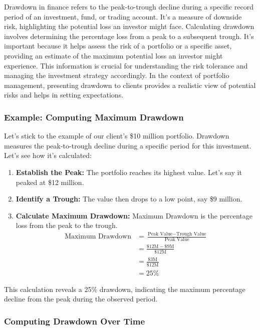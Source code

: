 \documentclass{article}
\begin{document}
Drawdown in finance refers to the peak-to-trough decline during a specific record period of an investment, fund, or trading account. It's a measure of downside risk, highlighting the potential loss an investor might face. Calculating drawdown involves determining the percentage loss from a peak to a subsequent trough. It's important because it helps assess the risk of a portfolio or a specific asset, providing an estimate of the maximum potential loss an investor might experience. This information is crucial for understanding the risk tolerance and managing the investment strategy accordingly. In the context of portfolio management, presenting drawdown to clients provides a realistic view of potential risks and helps in setting expectations.

\subsubsection{Example: Computing Maximum Drawdown}

Let's stick to the example of our client's \$10 million portfolio. Drawdown measures the peak-to-trough decline during a specific period for this investment. Let's see how it's calculated:

\begin{enumerate}
    \item \textbf{Establish the Peak:} The portfolio reaches its highest value. Let's say it peaked at \$12 million.
    \item \textbf{Identify a Trough:} The value then drops to a low point, say \$9 million.
    \item \textbf{Calculate Maximum Drawdown:} Maximum Drawdown is the percentage loss from the peak to the trough.
    \begin{align*}
        \text{Maximum Drawdown} &= \frac{\text{Peak Value} - \text{Trough Value}}{\text{Peak Value}}  \\
                       &= \frac{\$12\text{M} - \$9\text{M}}{\$12\text{M}}  \\
                       &= \frac{\$3\text{M}}{\$12\text{M}}\\
                       &= 25\%
    \end{align*}
\end{enumerate}

This calculation reveals a 25\% drawdown, indicating the maximum percentage decline from the peak during the observed period.

\subsubsection{Computing Drawdown Over Time}
\end{document}
